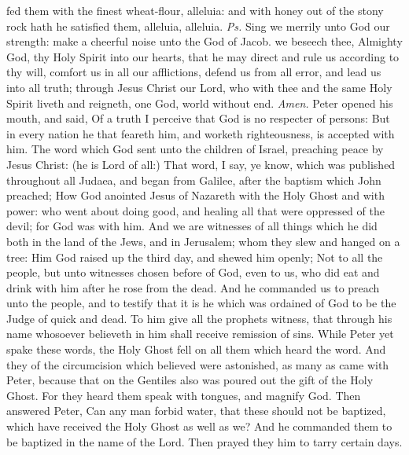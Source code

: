 \introit
{} fed them with the finest wheat-flour, alleluia: and with honey out of the stony rock hath he satisfied them, alleluia, alleluia. \textit{Ps.} Sing we merrily unto God our strength: make a cheerful noise unto the God of Jacob.
\collect
{} we beseech thee, Almighty God, thy Holy Spirit into our hearts, that he may direct and rule us according to thy will, comfort us in all our afflictions, defend us from all error, and lead us into all truth; through Jesus Christ our Lord, who with thee and the same Holy Spirit liveth and reigneth, one God, world without end. \textit{Amen.}
 Peter opened his mouth, and said, Of a truth I perceive that God is no respecter of persons: But in every nation he that feareth him, and worketh righteousness, is accepted with him. The word which God sent unto the children of Israel, preaching peace by Jesus Christ: (he is Lord of all:) That word, I say, ye know, which was published throughout all Judaea, and began from Galilee, after the baptism which John preached; How God anointed Jesus of Nazareth with the Holy Ghost and with power: who went about doing good, and healing all that were oppressed of the devil; for God was with him. And we are witnesses of all things which he did both in the land of the Jews, and in Jerusalem; whom they slew and hanged on a tree: Him God raised up the third day, and shewed him openly; Not to all the people, but unto witnesses chosen before of God, even to us, who did eat and drink with him after he rose from the dead. And he commanded us to preach unto the people, and to testify that it is he which was ordained of God to be the Judge of quick and dead. To him give all the prophets witness, that through his name whosoever believeth in him shall receive remission of sins. While Peter yet spake these words, the Holy Ghost fell on all them which heard the word. And they of the circumcision which believed were astonished, as many as came with Peter, because that on the Gentiles also was poured out the gift of the Holy Ghost. For they heard them speak with tongues, and magnify God. Then answered Peter, Can any man forbid water, that these should not be baptized, which have received the Holy Ghost as well as we? And he commanded them to be baptized in the name of the Lord. Then prayed they him to tarry certain days.

